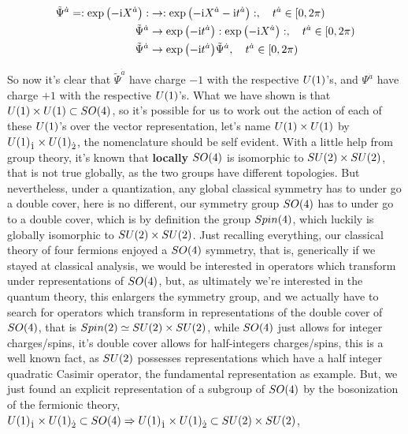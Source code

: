 \begin{align*}
    {\tilde\Psi}^{\dot a}=\cnord{\exp\qty(-\im X^{\dot a})}&\rightarrow\cnord{\exp\qty(-\im X^{\dot a}-\im t^{\dot a})},\ \ \ t^{\dot a}\in[0,2\pi)\\
    {\tilde\Psi}^{\dot a}&\rightarrow\exp\qty(-\im t^{\dot a})\cnord{\exp\qty(-\im X^{\dot a})},\ \ \ t^{\dot a}\in[0,2\pi)\\
    {\tilde\Psi}^{\dot a}&\rightarrow\exp\qty(-\im t^{\dot a}){\tilde\Psi}^{\dot a},\ \ \ t^{\dot a}\in[0,2\pi)
\end{align*}

So now it's clear that ${\tilde\Psi}^{\dot a}$ have charge $-1$ with the respective $U\qty(1)$'s, and $\Psi^{\dot a}$ have charge $+1$ with the 
respective $U\qty(1)$'s. What we have shown is that $U\qty(1)\times U\qty(1)\subset SO\qty(4)$, so it's possible for us to work out the action of each of these $U\qty(1)$'s over the vector representation, 
let's name $U\qty(1)\times U\qty(1)$ by $U\qty(1)_{\dot 1}\times U\qty(1)_{\dot 2}$, the nomenclature should be self evident. With a little 
help from group theory, it's known that \textbf{locally} $SO\qty(4)$ is isomorphic to $SU\qty(2)\times SU\qty(2)$, that is not true globally, as the 
two groups have different topologies. But nevertheless, under a quantization, any global classical symmetry has to under go a double cover, here is no 
different, our symmetry group $SO\qty(4)$ has to under go to a double cover, which is by definition the group $Spin\qty(4)$, which luckily is 
globally isomorphic to $SU\qty(2)\times SU\qty(2)$. Just recalling everything, our classical theory of four fermions 
enjoyed a $SO\qty(4)$ symmetry, that is, generically if we stayed at classical analysis, we would be interested in 
operators which transform under representations of $SO\qty(4)$, but, as ultimately we're interested in the quantum theory, 
this enlargers the symmetry group, and we actually have to search for operators which transform in representations of the double cover of $SO\qty(4)$, 
that is $Spin\qty(2)\simeq SU\qty(2)\times SU\qty(2)$, while $SO\qty(4)$ just allows for integer charges/spins, it's double cover 
allows for half-integers charges/spins, this is a well known fact, as $SU\qty(2)$ possesses representations which have a half integer 
quadratic Casimir operator, the fundamental representation as example. But, we just found an explicit representation of a subgroup of $SO\qty(4)$ by the 
bosonization of the fermionic theory, $U\qty(1)_{\dot 1}\times U\qty(1)_{\dot 2}\subset SO\qty(4)\Rightarrow U\qty(1)_{\dot 1}\times U\qty(1)_{\dot 2}\subset SU\qty(2)\times SU\qty(2)$, 
